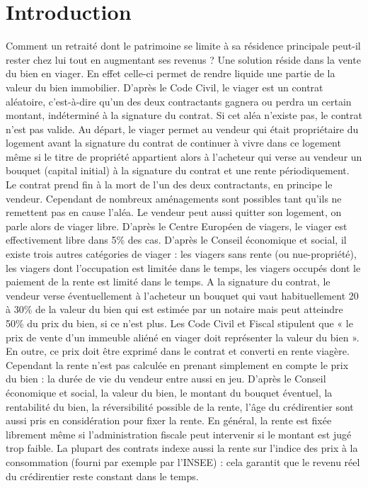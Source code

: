 \documentclass[12pt,a4paper]{article}
\begin{document}
\section*{Introduction}
Comment un retraité dont le patrimoine se limite à sa résidence principale peut-il rester chez lui tout en augmentant ses revenus ? Une solution réside dans la vente du bien en viager. En effet celle-ci permet de rendre liquide une partie de la valeur du bien immobilier. D’après le Code Civil, le viager est un contrat aléatoire, c’est-à-dire qu’un des deux contractants gagnera ou perdra un certain montant, indéterminé à la signature du contrat. Si cet aléa n’existe pas, le contrat n’est pas valide.
Au départ, le viager permet au vendeur qui était propriétaire du logement avant la signature du contrat de continuer à vivre dans ce logement même si le titre de propriété appartient alors à l’acheteur qui verse au vendeur un bouquet (capital initial) à la signature du contrat et une rente périodiquement. Le contrat prend fin à la mort de l’un des deux contractants, en principe le vendeur. Cependant de nombreux aménagements sont possibles tant qu’ils ne remettent pas en cause l’aléa. Le vendeur peut aussi quitter son logement, on parle alors de viager libre. D’après le Centre Européen de viagers, le viager est effectivement libre dans 5\% des cas. D’après le Conseil économique et social, il existe trois autres catégories de viager : les viagers sans rente (ou nue-propriété), les viagers dont l’occupation est limitée dans le temps, les viagers occupés dont le paiement de la rente est limité dans le temps.
A la signature du contrat, le vendeur verse éventuellement à l’acheteur un bouquet qui vaut habituellement 20 à 30\% de la valeur du bien qui est estimée par un notaire mais peut atteindre 50\% du prix du bien, si ce n’est plus. Les Code Civil et Fiscal stipulent que « le prix de vente d’un immeuble aliéné en viager doit représenter la valeur du bien ». En outre, ce prix doit être exprimé dans le contrat et converti en rente viagère. Cependant la rente n’est pas calculée en prenant simplement en compte le prix du bien : la durée de vie du vendeur entre aussi en jeu. D’après le Conseil économique et social, la valeur du bien, le montant du bouquet éventuel, la rentabilité du bien, la réversibilité possible de la rente, l’âge du crédirentier sont aussi pris en considération pour fixer la rente. En général, la rente est fixée librement même si l’administration fiscale peut intervenir si le montant est jugé trop faible. La plupart des contrats indexe aussi la rente sur l’indice des prix à la consommation (fourni par exemple par l’INSEE) : cela garantit que le revenu réel du crédirentier reste constant dans le temps.
\end{document}
